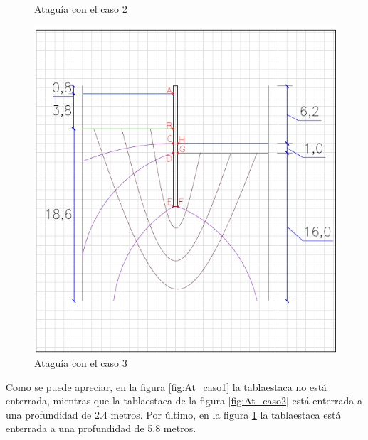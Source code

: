 \documentclass{article}
\begin{document}
\begin{figure}[h]
\begin{minipage}{0.32\textwidth}
        \caption{Ataguía con el caso 2}
        \label{fig:At_caso2}
    \end{minipage}
    \hfill
    \begin{minipage}{0.32\textwidth}
        \centering
        \includegraphics[width=\textwidth]{graficos/At_caso3.png}
        \caption{Ataguía con el caso 3}
        \label{fig:At_caso3}
    \end{minipage}
\end{figure}

Como se puede apreciar, en la figura \ref{fig:At_caso1} la tablaestaca no está enterrada, mientras que la tablaestaca de la figura \ref{fig:At_caso2} está enterrada a una profundidad de 2.4 metros. Por último, en la figura \ref{fig:At_caso3} la tablaestaca está enterrada a una profundidad de 5.8 metros.
\end{document}
